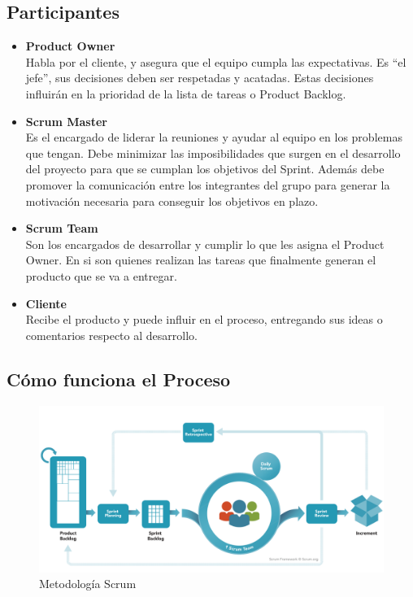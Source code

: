\subsection{Participantes}
\begin{itemize}
\item \textbf{Product Owner}\\
Habla por el cliente, y asegura que el equipo cumpla las expectativas. Es “el jefe”, sus decisiones deben ser
respetadas y acatadas. Estas  decisiones influirán en la prioridad de la lista de tareas o Product Backlog.



\item \textbf{Scrum Master}\\
Es el encargado de liderar la reuniones y ayudar al equipo en los problemas que tengan. Debe minimizar las imposibilidades que surgen en el desarrollo del proyecto para que se cumplan los objetivos del Sprint. Además debe promover la comunicación entre los integrantes del grupo para generar la motivación necesaria para conseguir los objetivos en plazo.




\item  \textbf{Scrum Team}\\
Son los encargados de desarrollar y cumplir lo que les asigna el Product Owner. En si son quienes realizan las tareas que finalmente generan el producto que se va a entregar.


\item  \textbf{Cliente}\\
Recibe el producto y puede influir en el proceso, entregando sus ideas o comentarios respecto al desarrollo.
\end{itemize}

\subsection{Cómo funciona el Proceso}



\begin{figure}[H]
		\centering
		\includegraphics[width=\textwidth] {scrum.jpg}
		\caption{Metodología Scrum }
		\label{fig:scrum}
	\end{figure} 


